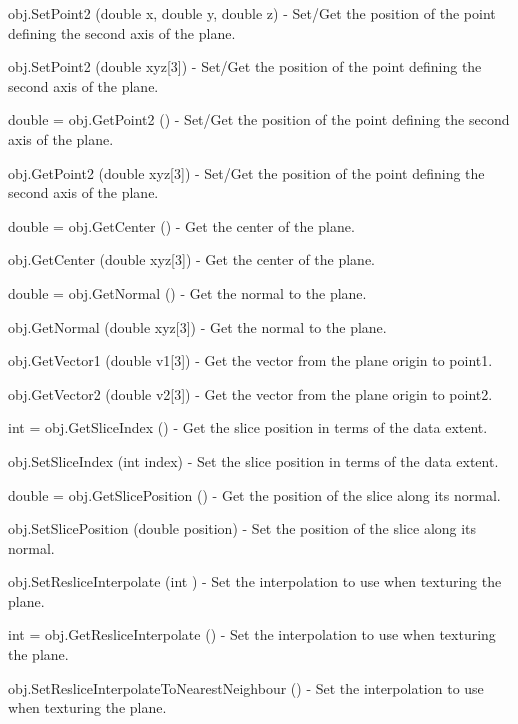 \begin{DoxyItemize}
\item {\ttfamily obj.\-Set\-Point2 (double x, double y, double z)} -\/ Set/\-Get the position of the point defining the second axis of the plane.  
\item {\ttfamily obj.\-Set\-Point2 (double xyz\mbox{[}3\mbox{]})} -\/ Set/\-Get the position of the point defining the second axis of the plane.  
\item {\ttfamily double = obj.\-Get\-Point2 ()} -\/ Set/\-Get the position of the point defining the second axis of the plane.  
\item {\ttfamily obj.\-Get\-Point2 (double xyz\mbox{[}3\mbox{]})} -\/ Set/\-Get the position of the point defining the second axis of the plane.  
\item {\ttfamily double = obj.\-Get\-Center ()} -\/ Get the center of the plane.  
\item {\ttfamily obj.\-Get\-Center (double xyz\mbox{[}3\mbox{]})} -\/ Get the center of the plane.  
\item {\ttfamily double = obj.\-Get\-Normal ()} -\/ Get the normal to the plane.  
\item {\ttfamily obj.\-Get\-Normal (double xyz\mbox{[}3\mbox{]})} -\/ Get the normal to the plane.  
\item {\ttfamily obj.\-Get\-Vector1 (double v1\mbox{[}3\mbox{]})} -\/ Get the vector from the plane origin to point1.  
\item {\ttfamily obj.\-Get\-Vector2 (double v2\mbox{[}3\mbox{]})} -\/ Get the vector from the plane origin to point2.  
\item {\ttfamily int = obj.\-Get\-Slice\-Index ()} -\/ Get the slice position in terms of the data extent.  
\item {\ttfamily obj.\-Set\-Slice\-Index (int index)} -\/ Set the slice position in terms of the data extent.  
\item {\ttfamily double = obj.\-Get\-Slice\-Position ()} -\/ Get the position of the slice along its normal.  
\item {\ttfamily obj.\-Set\-Slice\-Position (double position)} -\/ Set the position of the slice along its normal.  
\item {\ttfamily obj.\-Set\-Reslice\-Interpolate (int )} -\/ Set the interpolation to use when texturing the plane.  
\item {\ttfamily int = obj.\-Get\-Reslice\-Interpolate ()} -\/ Set the interpolation to use when texturing the plane.  
\item {\ttfamily obj.\-Set\-Reslice\-Interpolate\-To\-Nearest\-Neighbour ()} -\/ Set the interpolation to use when texturing the plane.  

\end{DoxyItemize}
